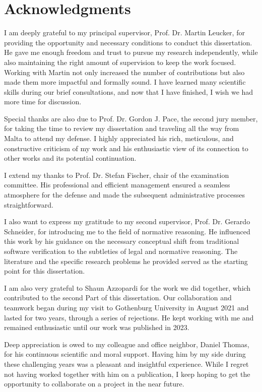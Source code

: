 \cleardoublepage
\thispagestyle{plain}

\section*{Acknowledgments}


I am deeply grateful to my principal supervisor, Prof. Dr. Martin Leucker, for providing the opportunity and necessary conditions to conduct this dissertation. He gave me enough freedom and trust to pursue my research independently, while also maintaining the right amount of supervision to keep the work focused. Working with Martin not only increased the number of contributions but also made them more impactful and formally sound. I have learned many scientific skills during our brief consultations, and now that I have finished, I wish we had more time for discussion.

Special thanks are also due to Prof. Dr. Gordon J. Pace,  the second jury member, for taking the time to review my dissertation and traveling all the way from Malta to attend my defense. I highly appreciated his rich, meticulous, and constructive criticism of my work and his enthusiastic view of its connection to other works and its potential continuation.

I extend my thanks to Prof. Dr. Stefan Fischer, chair of the examination committee. His professional and efficient management ensured a seamless atmosphere for the defense and made the subsequent administrative processes straightforward.

I also want to express my gratitude to my second supervisor, Prof. Dr. Gerardo Schneider, for introducing me to the field of normative reasoning.  He influenced this work by his guidance on the necessary conceptual shift from traditional software verification to the subtleties of legal and normative reasoning. The literature and the specific research problems he provided served as the starting point for this dissertation.

I am also very grateful to Shaun Azzopardi for the work we did together, which contributed to the second Part of this dissertation. Our collaboration and teamwork began during my visit to Gothenburg University in August 2021 and lasted for two years, through a series of rejections. He kept working with me and remained enthusiastic until our work was published in 2023.

Deep appreciation is owed to my colleague and office neighbor, Daniel Thomas, for his continuous scientific and moral support. Having him by my side during these challenging years was a pleasant and insightful experience. While I regret not having worked together with him on a publication, I keep hoping to get the opportunity to collaborate on a project in the near future.

